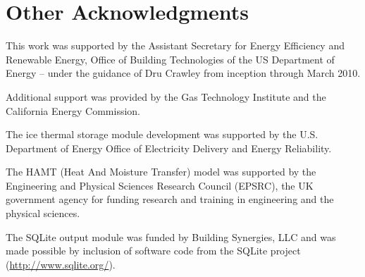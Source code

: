 \section{Other Acknowledgments}\label{other-acknowledgments}

This work was supported by the Assistant Secretary for Energy Efficiency and Renewable Energy, Office of Building Technologies of the US Department of Energy -- under the guidance of Dru Crawley from inception through March 2010.

Additional support was provided by the Gas Technology Institute and the California Energy Commission.

The ice thermal storage module development was supported by the U.S. Department of Energy Office of Electricity Delivery and Energy Reliability.

The HAMT (Heat And Moisture Transfer) model was supported by the Engineering and Physical Sciences Research Council (EPSRC), the UK government agency for funding research and training in engineering and the physical sciences.

The SQLite output module was funded by Building Synergies, LLC and was made possible by inclusion of software code from the SQLite project (\url{http://www.sqlite.org/}).
